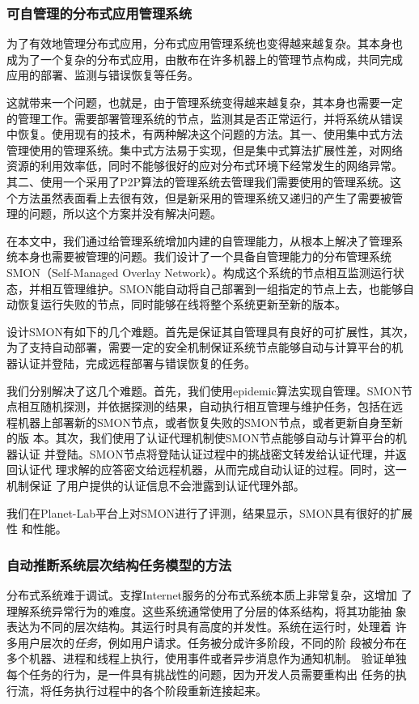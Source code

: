 \subsubsection*{可自管理的分布式应用管理系统}

为了有效地管理分布式应用，分布式应用管理系统也变得越来越复杂。其本身也
成为了一个复杂的分布式应用，由散布在许多机器上的管理节点构成，共同完成
应用的部署、监测与错误恢复等任务。

这就带来一个问题，也就是，由于管理系统变得越来越复杂，其本身也需要一定
的管理工作。需要部署管理系统的节点，监测其是否正常运行，并将系统从错误
中恢复。使用现有的技术，有两种解决这个问题的方法。其一、使用集中式方法
管理使用的管理系统。集中式方法易于实现，但是集中式算法扩展性差，对网络
资源的利用效率低，同时不能够很好的应对分布式环境下经常发生的网络异常。
其二、使用一个采用了P2P算法的管理系统去管理我们需要使用的管理系统。这
个方法虽然表面看上去很有效，但是新采用的管理系统又递归的产生了需要被管
理的问题，所以这个方案并没有解决问题。

在本文中，我们通过给管理系统增加内建的自管理能力，从根本上解决了管理系
统本身也需要被管理的问题。我们设计了一个具备自管理能力的分布管理系统
SMON（Self-Managed Overlay Network）。构成这个系统的节点相互监测运行状
态，并相互管理维护。SMON能自动将自己部署到一组指定的节点上去，也能够自
动恢复运行失败的节点，同时能够在线将整个系统更新至新的版本。

设计SMON有如下的几个难题。首先是保证其自管理具有良好的可扩展性，其次，
为了支持自动部署，需要一定的安全机制保证系统节点能够自动与计算平台的机
器认证并登陆，完成远程部署与错误恢复的任务。

我们分别解决了这几个难题。首先，我们使用epidemic算法实现自管理。SMON节
点相互随机探测，并依据探测的结果，自动执行相互管理与维护任务，包括在远
程机器上部署新的SMON节点，或者恢复失败的SMON节点，或者更新自身至新的版
本。其次，我们使用了认证代理机制使SMON节点能够自动与计算平台的机器认证
并登陆。SMON节点将登陆认证过程中的挑战密文转发给认证代理，并返回认证代
理求解的应答密文给远程机器，从而完成自动认证的过程。同时，这一机制保证
了用户提供的认证信息不会泄露到认证代理外部。

我们在Planet-Lab平台上对SMON进行了评测，结果显示，SMON具有很好的扩展性
和性能。

\subsubsection*{自动推断系统层次结构任务模型的方法}

分布式系统难于调试。支撑Internet服务的分布式系统本质上非常复杂，这增加
了理解系统异常行为的难度。这些系统通常使用了分层的体系结构，将其功能抽
象表达为不同的层次结构。其运行时具有高度的并发性。系统在运行时，处理着
许多用户层次的\emph{任务}，例如用户请求。任务被分成许多阶段，不同的阶
段被分布在多个机器、进程和线程上执行，使用事件或者异步消息作为通知机制。
验证单独每个任务的行为，是一件具有挑战性的问题，因为开发人员需要重构出
任务的执行流，将任务执行过程中的各个阶段重新连接起来。

